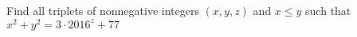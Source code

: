 Find all triplets of nonnegative integers $(x,y,z)$ and $x\leq y$ such that$x^2+y^2=3 \cdot 2016^z+77$